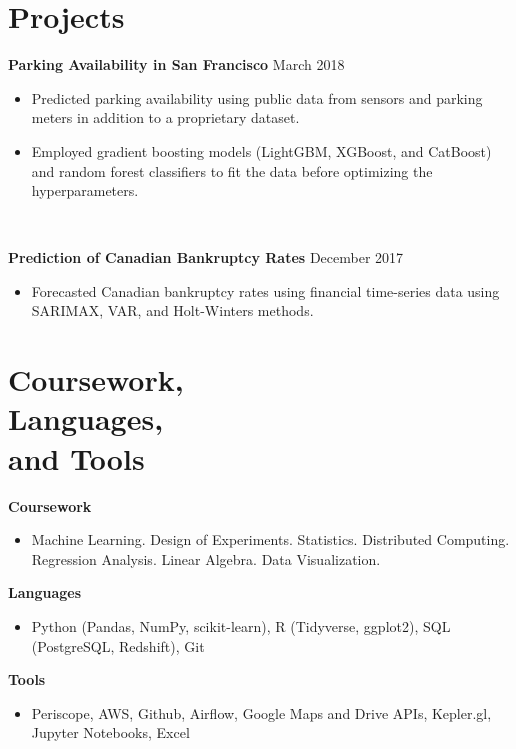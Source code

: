 \documentclass[line, margin]{res}
\begin{document}
\begin{resume}
\section{Projects}
	\textbf{Parking Availability in San Francisco} \hfill{March 2018}
	\begin{itemize}
		\item Predicted parking availability using public data from sensors and parking meters in addition to a proprietary dataset.
		\item Employed gradient boosting models (LightGBM, XGBoost, and CatBoost) and random forest classifiers to fit the data before optimizing the hyperparameters. %
	\end{itemize} \

	\textbf{Prediction of Canadian Bankruptcy Rates} \hfill{December 2017}
	\begin{itemize}
		\item Forecasted Canadian bankruptcy rates using financial time-series data using SARIMAX, VAR, and Holt-Winters methods.
	\end{itemize}
 
\section{Coursework, \\ Languages, \\ and Tools} 
	\textbf{Coursework} \
	\begin{itemize}
		\item Machine Learning. Design of Experiments. Statistics. Distributed Computing. Regression Analysis. Linear Algebra. Data Visualization. 
	\end{itemize}
	\textbf{Languages} \
	\begin{itemize}
		\item Python (Pandas, NumPy, scikit-learn), R (Tidyverse, ggplot2), SQL (PostgreSQL, Redshift), Git %
	\end{itemize} 
	\textbf{Tools} \
	\begin{itemize}
		\item Periscope, AWS, Github, Airflow, Google Maps and Drive APIs, Kepler.gl, Jupyter Notebooks, Excel
	\end{itemize}
		

\end{resume}
\end{document}
